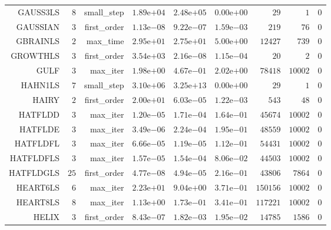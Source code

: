 \begin{longtable}{rrrrrrrrr}
GAUSS3LS & \(     8\) & small\_step & \( 1.89\)e\(+04\) & \( 2.48\)e\(+05\) & \( 0.00\)e\(+00\) & \(    29\) & \(     1\) & \(     0\) \\
GAUSSIAN & \(     3\) & first\_order & \( 1.13\)e\(-08\) & \( 9.22\)e\(-07\) & \( 1.59\)e\(-03\) & \(   219\) & \(    76\) & \(     0\) \\
GBRAINLS & \(     2\) & max\_time & \( 2.95\)e\(+01\) & \( 2.75\)e\(+01\) & \( 5.00\)e\(+00\) & \( 12427\) & \(   739\) & \(     0\) \\
GROWTHLS & \(     3\) & first\_order & \( 3.54\)e\(+03\) & \( 2.16\)e\(-08\) & \( 1.15\)e\(-04\) & \(    20\) & \(     2\) & \(     0\) \\
GULF & \(     3\) & max\_iter & \( 1.98\)e\(+00\) & \( 4.67\)e\(-01\) & \( 2.02\)e\(+00\) & \( 78418\) & \( 10002\) & \(     0\) \\
HAHN1LS & \(     7\) & small\_step & \( 3.10\)e\(+06\) & \( 3.25\)e\(+13\) & \( 0.00\)e\(+00\) & \(    29\) & \(     1\) & \(     0\) \\
HAIRY & \(     2\) & first\_order & \( 2.00\)e\(+01\) & \( 6.03\)e\(-05\) & \( 1.22\)e\(-03\) & \(   543\) & \(    48\) & \(     0\) \\
HATFLDD & \(     3\) & max\_iter & \( 1.20\)e\(-05\) & \( 1.71\)e\(-04\) & \( 1.64\)e\(-01\) & \( 45674\) & \( 10002\) & \(     0\) \\
HATFLDE & \(     3\) & max\_iter & \( 3.49\)e\(-06\) & \( 2.24\)e\(-04\) & \( 1.95\)e\(-01\) & \( 48559\) & \( 10002\) & \(     0\) \\
HATFLDFL & \(     3\) & max\_iter & \( 6.66\)e\(-05\) & \( 1.19\)e\(-05\) & \( 1.12\)e\(-01\) & \( 54431\) & \( 10002\) & \(     0\) \\
HATFLDFLS & \(     3\) & max\_iter & \( 1.57\)e\(-05\) & \( 1.54\)e\(-04\) & \( 8.06\)e\(-02\) & \( 44503\) & \( 10002\) & \(     0\) \\
HATFLDGLS & \(    25\) & first\_order & \( 4.77\)e\(-08\) & \( 4.94\)e\(-05\) & \( 2.16\)e\(-01\) & \( 43806\) & \(  7864\) & \(     0\) \\
HEART6LS & \(     6\) & max\_iter & \( 2.23\)e\(+01\) & \( 9.04\)e\(+00\) & \( 3.71\)e\(-01\) & \(150156\) & \( 10002\) & \(     0\) \\
HEART8LS & \(     8\) & max\_iter & \( 1.13\)e\(+00\) & \( 1.73\)e\(-01\) & \( 3.41\)e\(-01\) & \(117221\) & \( 10002\) & \(     0\) \\
HELIX & \(     3\) & first\_order & \( 8.43\)e\(-07\) & \( 1.82\)e\(-03\) & \( 1.95\)e\(-02\) & \( 14785\) & \(  1586\) & \(     0\) \\

\end{longtable}
